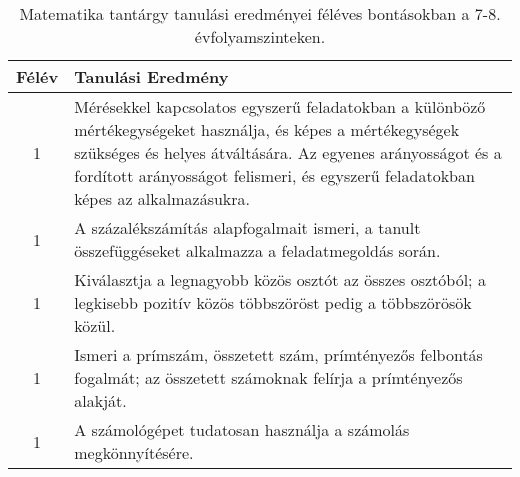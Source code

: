        
           \begin{longtable}{c | p{12cm} }
            \caption[Matematika 7-8.]{Matematika tantárgy tanulási eredményei féléves bontásokban a 7-8. évfolyamszinteken. }  \\

            \textbf{Félév} & \textbf{Tanulási Eredmény} \\
            \hline
            \endhead
                                
                                      
                                
                                          1 &  Mérésekkel kapcsolatos egyszerű feladatokban a különböző mértékegységeket használja, és képes a mértékegységek szükséges és helyes átváltására. Az egyenes arányosságot és a fordított arányosságot felismeri, és egyszerű feladatokban képes az alkalmazásukra.
 \\ \hline
                                          1 &  A százalékszámítás alapfogalmait ismeri, a tanult összefüggéseket alkalmazza a  feladatmegoldás során. \\ \hline
                                          1 &  Kiválasztja a legnagyobb közös osztót az összes osztóból; a legkisebb pozitív közös többszöröst pedig a többszörösök közül. \\ \hline
                                          1 &  Ismeri a prímszám, összetett szám, prímtényezős felbontás fogalmát; az összetett számoknak felírja a prímtényezős alakját. \\ \hline
                                          1 &  A számológépet tudatosan használja a számolás megkönnyítésére. \\ \hline
                                      

\end{longtable}
